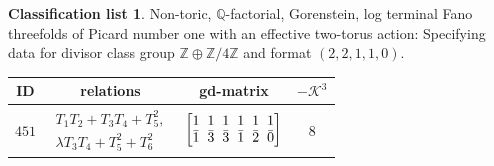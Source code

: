 \documentclass[pdftex]{sigma}%
\theoremstyle{definition}
\newtheorem{class-list}[thm]{Classification list}
\def\ZZ{{\mathbb Z}}
\def\QQ{{\mathbb Q}}
\numberwithin{equation}{section}
\begin{document}
\begin{class-list}
Non-toric, $\QQ$-factorial, Gorenstein, log terminal Fano
threefolds of Picard number one with an effective two-torus action:
Specifying data for divisor class group $\ZZ\oplus \ZZ/4\ZZ$ and
format $(2,2,1,1,0)$.
\begin{table}[h!]\centering\setlength{\tabcolsep}{5.5pt}
\renewcommand{\arraystretch}{1.35}\small\tabulinesep=1mm
\begin{tabu}{c|c|c|c}
\hline
ID&relations&gd-matrix&$-\mathcal{K}^3$
\\
\hline
${451}$&$\begin{array}{r}{T_{1}T_{2}+T_{3}T_{4}+T_{5}^{2}},\\ {\lambda T_{3}T_{4}+T_{5}^{2}+T_{6}^{2}}\end{array}$
&$\arraycolsep=1mm\begin{bmatrix}{1} & {1} & {1} & {1} & {1} & {1} \\ {\bar{1}} & {\bar{3}} & {\bar{3}} & {\bar{1}} & {\bar{2}} & {\bar{0}}\end{bmatrix}$&${8}$
\\
\hline
\end{tabu}\vspace{4mm}
\end{table}
\end{class-list}

\newpage
\end{document}
